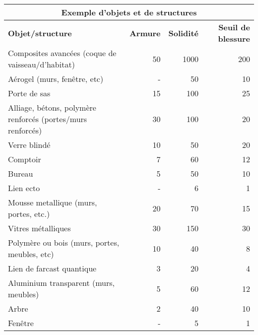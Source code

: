 \begin{table} \begin{tabularx}{\textwidth}{|X|r|r|r|} \hline

\multicolumn{4}{|c|}{\textbf{Exemple d'objets et de structures}} \\ \hline

\textbf{Objet/structure} &\textbf{Armure} &\textbf{Solidité} &\textbf{Seuil de blessure}	\\ \hline

Composites avancées (coque de vaisseau/d'habitat)	&50	&1000	&200	\\ \hline

Aérogel (murs, fenêtre, etc)	&-	&50	&10	\\ \hline

Porte de sas	&15	&100	&25	\\ \hline

Alliage, bétons, polymère renforcés (portes/murs renforcés)	&30	&100	&20	\\ \hline

Verre blindé	&10	&50	&20	\\ \hline

Comptoir	&7	&60	&12	\\ \hline

Bureau	&5	&50	&10	\\ \hline

Lien ecto	&-	&6	&1	\\ \hline

Mousse metallique (murs, portes, etc.)	&20	&70	&15	\\ \hline

Vitres métalliques	&30	&150	&30	\\ \hline

Polymère ou bois (murs, portes, meubles, etc)	&10	&40	&8	\\ \hline

Lien de farcast quantique	&3	&20	&4	\\ \hline

Aluminium transparent (murs, meubles)	&5	&60	&12	\\ \hline

Arbre	&2	&40	&10	\\ \hline

Fenêtre	&-	&5	&1	\\ \hline

\end{tabularx} \label{tab:sample-objects-structures} \end{table} 

